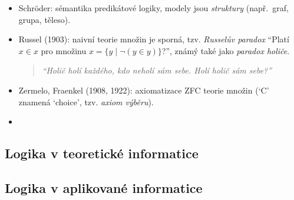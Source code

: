 \begin{itemize}
    \item Schröder: sémantika predikátové logiky, modely jsou \emph{struktury} (např.\ graf, grupa, těleso).
            
    \item Russel (1903): naivní teorie množin je sporná, tzv. \emph{Russelův paradox} ``Platí \( x \in x \) pro množinu \( x = \{y\mid \neg (y \in y)\}\)?'', známý také jako \emph{paradox holiče}.
        
        \begin{quote}\it
            ``Holič holí každého, kdo neholí sám sebe. Holí holič sám sebe?''
        \end{quote}
            
    \item Zermelo, Fraenkel (1908, 1922): axiomatizace ZFC teorie množin (`C' znamená `choice', tzv. \emph{axiom výběru}).
       
    \item \todo
\end{itemize}

\subsection*{Logika v teoretické informatice}

\textbf{\todo}

\subsection*{Logika v aplikované informatice}

\todo
